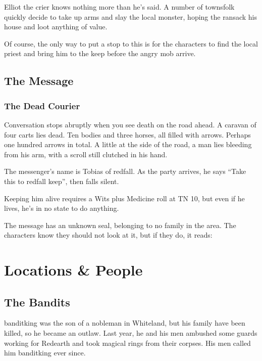 Elliot the crier knows nothing more than he's said.  A number of townsfolk quickly decide to take up arms and slay the local monster, hoping the ransack his house and loot anything of value.

Of course, the only way to put a stop to this is for the characters to find the local priest and bring him to the keep before the angry mob arrive.

\subsection[The Message]{The Message}\label{message}

\subsubsection{The Dead Courier}

\begin{boxtext}
Conversation stops abruptly when you see death on the road ahead.  A caravan of four carts lies dead.  Ten bodies and three horses, all filled with arrows.  Perhaps one hundred arrows in total.  A little at the side of the road, a man lies bleeding from his arm, with a scroll still clutched in his hand.
\end{boxtext}

The messenger's name is Tobias of \gls{redfall}.  As the party arrives, he says ``Take this to \gls{redfall} keep'', then falls silent.

Keeping him alive requires a Wits plus Medicine roll at TN 10, but even if he lives, he's in no state to do anything.

The message has an unknown seal, belonging to no family in the area.  The characters know they should not look at it, but if they do, it reads:

\section{Locations \& People}

\subsection{The Bandits}

\gls{banditking} was the son of a nobleman in Whiteland, but his family have been killed, so he became an outlaw.  Last year, he and his men ambushed some guards working for Redearth and took magical rings from their corpses.  His men called him \gls{banditking} ever since.

